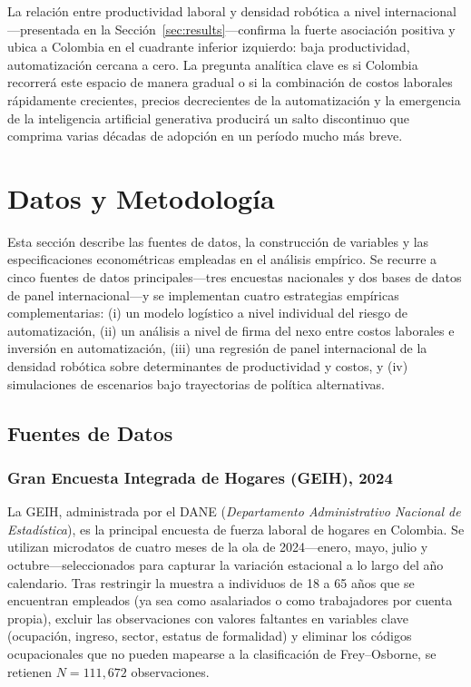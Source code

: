 \documentclass{article}
\begin{document}
La relaci\'on entre productividad laboral y densidad rob\'otica a nivel internacional---presentada en la Secci\'on~\ref{sec:results}---confirma la fuerte asociaci\'on positiva y ubica a Colombia en el cuadrante inferior izquierdo: baja productividad, automatizaci\'on cercana a cero. La pregunta anal\'itica clave es si Colombia recorrer\'a este espacio de manera gradual o si la combinaci\'on de costos laborales r\'apidamente crecientes, precios decrecientes de la automatizaci\'on y la emergencia de la inteligencia artificial generativa producir\'a un salto discontinuo que comprima varias d\'ecadas de adopci\'on en un per\'iodo mucho m\'as breve.


\FloatBarrier

\section{Datos y Metodolog\'ia}
\label{sec:data}

Esta secci\'on describe las fuentes de datos, la construcci\'on de variables y las especificaciones econom\'etricas empleadas en el an\'alisis emp\'irico. Se recurre a cinco fuentes de datos principales---tres encuestas nacionales y dos bases de datos de panel internacional---y se implementan cuatro estrategias emp\'iricas complementarias: (i) un modelo log\'istico a nivel individual del riesgo de automatizaci\'on, (ii) un an\'alisis a nivel de firma del nexo entre costos laborales e inversi\'on en automatizaci\'on, (iii) una regresi\'on de panel internacional de la densidad rob\'otica sobre determinantes de productividad y costos, y (iv) simulaciones de escenarios bajo trayectorias de pol\'itica alternativas.


\subsection{Fuentes de Datos}
\label{subsec:data_sources}

\subsubsection*{Gran Encuesta Integrada de Hogares (GEIH), 2024}

La GEIH, administrada por el DANE (\textit{Departamento Administrativo Nacional de Estad\'istica}), es la principal encuesta de fuerza laboral de hogares en Colombia. Se utilizan microdatos de cuatro meses de la ola de 2024---enero, mayo, julio y octubre---seleccionados para capturar la variaci\'on estacional a lo largo del a\~no calendario. Tras restringir la muestra a individuos de 18 a 65 a\~nos que se encuentran empleados (ya sea como asalariados o como trabajadores por cuenta propia), excluir las observaciones con valores faltantes en variables clave (ocupaci\'on, ingreso, sector, estatus de formalidad) y eliminar los c\'odigos ocupacionales que no pueden mapearse a la clasificaci\'on de Frey--Osborne, se retienen $N = 111{,}672$ observaciones.
\end{document}
